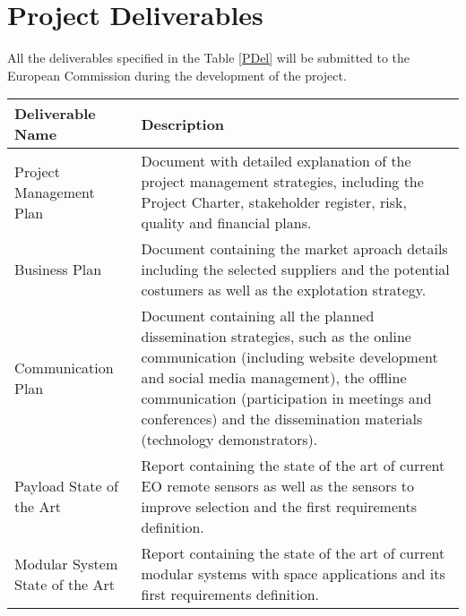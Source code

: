\section{Project Deliverables}

All the deliverables specified in the Table \ref{PDel} will be submitted to the European Commission during the development of the project. 

\begin{longtable}[H]{>{\raggedright\arraybackslash}p{4cm} p{10cm}}
	
	\toprule[2pt]
	
	\textbf{Deliverable Name} & \textbf{Description} \\
	
	\midrule[1.5pt] 
	\endhead
	
	Project Management Plan & Document with detailed explanation of the project management strategies, including the Project Charter, stakeholder register, risk, quality and financial plans.\vspace{0.2cm} \\
	
	\midrule

	Business Plan & Document containing the market aproach details including the selected suppliers and the potential costumers as well as the explotation strategy.\vspace{0.2cm} \\
	
	\midrule
	
	Communication Plan  & Document containing all the planned dissemination strategies, such as the online communication (including website development and social media management), the offline communication (participation in meetings and conferences) and the dissemination materials (technology demonstrators).\vspace{0.2cm} \\
	
	\midrule

	Payload State of the Art  & Report containing the state of the art of current EO remote sensors as well as the sensors to improve selection and the first requirements definition.\vspace{0.2cm} \\
	
	\midrule

	Modular System State of the Art  & Report containing the state of the art of current modular systems with space applications and its first requirements definition.\vspace{0.2cm} \\
	

\end{longtable}
